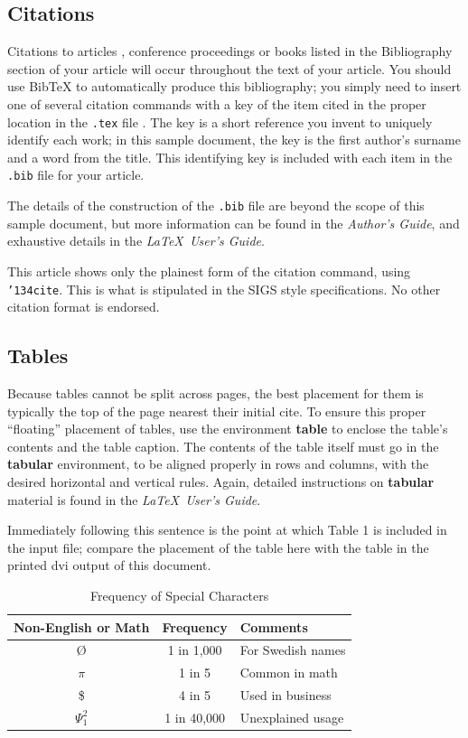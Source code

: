 \documentclass{sig-alternate2-pods09}
\begin{document}
\subsection{Citations}
Citations to articles \cite{bowman:reasoning, clark:pct, braams:babel, herlihy:methodology},
conference
proceedings \cite{clark:pct} or books \cite{salas:calculus, Lamport:LaTeX} listed
in the Bibliography section of your
article will occur throughout the text of your article.
You should use BibTeX to automatically produce this bibliography;
you simply need to insert one of several citation commands with
a key of the item cited in the proper location in
the \texttt{.tex} file \cite{Lamport:LaTeX}.
The key is a short reference you invent to uniquely
identify each work; in this sample document, the key is
the first author's surname and a
word from the title.  This identifying key is included
with each item in the \texttt{.bib} file for your article.

The details of the construction of the \texttt{.bib} file
are beyond the scope of this sample document, but more
information can be found in the \textit{Author's Guide},
and exhaustive details in the \textit{\LaTeX\ User's
Guide}\cite{Lamport:LaTeX}.

This article shows only the plainest form
of the citation command, using \texttt{{\char'134}cite}.
This is what is stipulated in the SIGS style specifications.
No other citation format is endorsed.

\subsection{Tables}
Because tables cannot be split across pages, the best
placement for them is typically the top of the page
nearest their initial cite.  To
ensure this proper ``floating'' placement of tables, use the
environment \textbf{table} to enclose the table's contents and
the table caption.  The contents of the table itself must go
in the \textbf{tabular} environment, to
be aligned properly in rows and columns, with the desired
horizontal and vertical rules.  Again, detailed instructions
on \textbf{tabular} material
is found in the \textit{\LaTeX\ User's Guide}.

Immediately following this sentence is the point at which
Table 1 is included in the input file; compare the
placement of the table here with the table in the printed
dvi output of this document.

\begin{table}
\centering
\caption{Frequency of Special Characters}
\begin{tabular}{|c|c|l|} \hline
Non-English or Math&Frequency&Comments\\ \hline
\O & 1 in 1,000& For Swedish names\\ \hline
$\pi$ & 1 in 5& Common in math\\ \hline
\$ & 4 in 5 & Used in business\\ \hline
$\Psi^2_1$ & 1 in 40,000& Unexplained usage\\
\hline\end{tabular}
\end{table}
\end{document}

